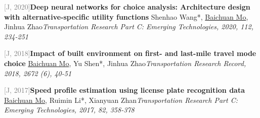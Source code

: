 \par\noindent\begin{minipage}{\linewidth}
{\textcolor{gray}{[J\themyCounter, 2020]\;}}{\textbf{Deep neural networks for choice analysis: Architecture design with alternative-specific utility functions} \href{https://doi.org/10.1016/j.trc.2020.01.012}{\textcolor{cadmiumorange}{\faExternalLink}}}{\newline Shenhao Wang*, \underline{Baichuan Mo}, Jinhua Zhao}{\newline \emph{Transportation Research Part C: Emerging Technologies, 2020, 112, 234-251}}{{\;     }}{}
\end{minipage}\par\vspace{5.5pt}


\par\noindent\begin{minipage}{\linewidth}
{\textcolor{gray}{[J\themyCounter, 2018]\;}}{\textbf{Impact of built environment on first- and last-mile travel mode choice} \href{https://doi.org/10.1177/0361198118788423}{\textcolor{cadmiumorange}{\faExternalLink}}}{\newline \underline{Baichuan Mo}, Yu Shen*, Jinhua Zhao}{\newline \emph{Transportation Research Record, 2018, 2672 (6), 40-51}}{{\;    }}{}
\end{minipage}\par\vspace{5.5pt}


\par\noindent\begin{minipage}{\linewidth}
{\textcolor{gray}{[J\themyCounter, 2017]\;}}{\textbf{Speed profile estimation using license plate recognition data} \href{https://doi.org/10.1016/j.trc.2017.07.006}{\textcolor{cadmiumorange}{\faExternalLink}}}{\newline \underline{Baichuan Mo}, Ruimin Li*, Xianyuan Zhan}{\newline \emph{Transportation Research Part C: Emerging Technologies, 2017, 82, 358-378}}{{\;     }}{}
\end{minipage}\par\vspace{5.5pt}


